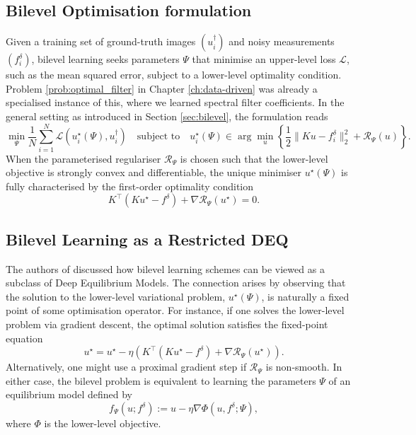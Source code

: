 \subsection{Bilevel Optimisation formulation}
Given a training set of ground-truth images $(u_i^\dagger)$ and noisy measurements $(f_i^\delta)$, bilevel learning seeks parameters $\Psi$ that minimise an upper-level loss $\mathcal{L}$, such as the mean squared error, subject to a lower-level optimality condition. Problem \ref{prob:optimal_filter} in Chapter \ref{ch:data-driven} was already a specialised instance of this, where we learned spectral filter coefficients. In the general setting as introduced in Section \ref{sec:bilevel}, the formulation reads
\begin{equation*}
    \min_\Psi \frac{1}{N} \sum_{i=1}^N \mathcal{L}(u_i^\star(\Psi), u_i^\dagger) \quad \text{subject to} \quad u_i^\star(\Psi) \in \arg\min_u \left\{ \frac{1}{2}\|Ku - f_i^\delta\|_2^2 + \mathcal{R}_\Psi(u) \right\}.
\end{equation*}
When the parameterised regulariser $\mathcal{R}_\Psi$ is chosen such that the lower-level objective is strongly convex and differentiable, the unique minimiser $u^\star(\Psi)$ is fully characterised by the first-order optimality condition
\begin{equation*}
    K^\top(K u^\star - f^\delta) + \nabla \mathcal{R}_\Psi(u^\star) = 0.
\end{equation*}

\subsection{Bilevel Learning as a Restricted DEQ}
The authors of \cite{riccio2022regularization} discussed how bilevel learning schemes can be viewed as a subclass of Deep Equilibrium Models. The connection arises by observing that the solution to the lower-level variational problem, $u^\star(\Psi)$, is naturally a fixed point of some optimisation operator. For instance, if one solves the lower-level problem via gradient descent, the optimal solution satisfies the fixed-point equation
\begin{equation}
    u^\star = u^\star - \eta \left( K^\top(K u^\star - f^\delta) + \nabla \mathcal{R}_\Psi(u^\star) \right).
\end{equation}
Alternatively, one might use a proximal gradient step if $\mathcal{R}_\Psi$ is non-smooth. In either case, the bilevel problem is equivalent to learning the parameters $\Psi$ of an equilibrium model defined by
\begin{equation}
    f_\Psi(u; f^\delta) := u - \eta \nabla \Phi(u, f^\delta; \Psi),
\end{equation}
where $\Phi$ is the lower-level objective.


